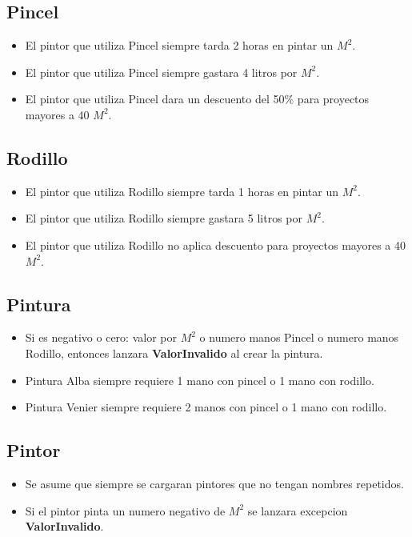 \documentclass[titlepage,a4paper]{article}
\begin{document}
  \subsection{Pincel}
    \begin{itemize}
      \item El pintor que utiliza Pincel siempre tarda 2 horas en pintar un $M^2$.
      \item El pintor que utiliza Pincel siempre gastara 4 litros por $M^2$.
      \item El pintor que utiliza Pincel dara un descuento del 50\% para proyectos mayores a 40 $M^2$.
    \end{itemize}

  \subsection{Rodillo}
    \begin{itemize}
      \item El pintor que utiliza Rodillo siempre tarda 1 horas en pintar un $M^2$.
      \item El pintor que utiliza Rodillo siempre gastara 5 litros por $M^2$.
      \item El pintor que utiliza Rodillo no aplica descuento para proyectos mayores a 40 $M^2$.
    \end{itemize}

  \subsection{Pintura}
    \begin{itemize}
      \item Si es negativo o cero: valor por $M^2$ o numero manos Pincel o numero manos Rodillo, entonces lanzara \textbf{ValorInvalido} al crear la pintura.
      \item Pintura Alba siempre requiere 1 mano con pincel o 1 mano con rodillo.
      \item Pintura Venier siempre requiere 2 manos con pincel o 1 mano con rodillo.
    \end{itemize}

  \subsection{Pintor}
    \begin{itemize}
      \item Se asume que siempre se cargaran pintores que no tengan nombres repetidos.
      \item Si el pintor pinta un numero negativo de $M^2$ se lanzara excepcion \textbf{ValorInvalido}.
    \end{itemize}
  
\end{document}
